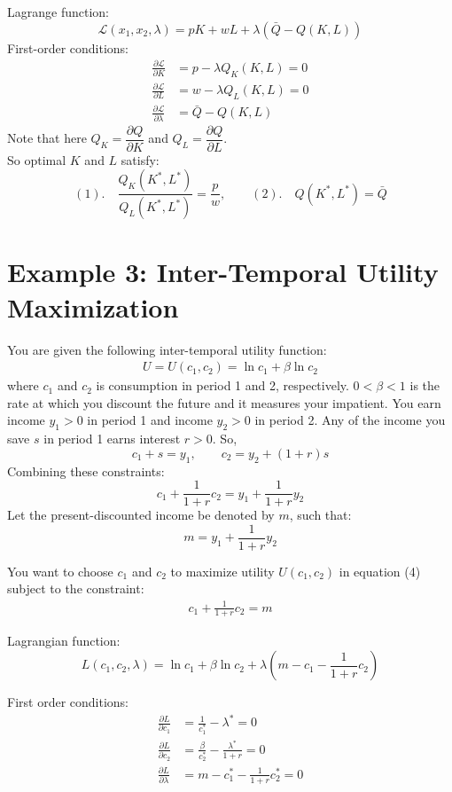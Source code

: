 \documentclass{./../../latex/handout}
\begin{document}
Lagrange function: 
  \[ \mathcal{L}(x_1,x_2,\lambda) =  p K + w L + \lambda(\bar{Q}-Q(K,L))\]
First-order conditions:
\begin{align*}
	\frac{\partial \mathcal{L}}{\partial K} &= p-\lambda Q_K(K,L)=0 \\ 
	 \frac{\partial \mathcal{L}}{\partial L} &= w-\lambda Q_L(K,L) = 0 \\
	  \frac{\partial \mathcal{L}}{\partial \lambda} &= \bar{Q}-Q(K,L)
\end{align*}
Note that here $Q_K = \dfrac{\partial Q}{\partial K}$ and $Q_L = \dfrac{\partial Q}{\partial L}$. \\

So optimal $K$ and $L$ satisfy:
\[ (1). \quad \frac{Q_K(K^*,L^*)}{Q_L(K^*,L^*)} = \frac{p}{w},  \quad \quad (2). \quad Q(K^*,L^*) = \bar{Q}\] 

\section*{Example 3: Inter-Temporal Utility Maximization}
You are given the following inter-temporal utility function:
\begin{align}
	U = U(c_1, c_2) =  \ln c_1 + \beta \ln c_2
\end{align}
where $c_1$ and $c_2$ is consumption in period 1 and 2, respectively. $0<\beta<1$ is the rate at which you discount the future and it measures your impatient. You earn income $y_1>0$ in period 1 and income $y_2>0$ in period 2. Any of the income you save $s$ in period 1 earns interest $r>0$. So, \[ c_1 + s = y_1, \quad \quad c_2 = y_2 + (1+r) s \]
Combining these constraints:
\[ c_1 + \frac{1}{1+r} c_2 = y_1 + \frac{1}{1+r} y_2 \]
Let the present-discounted income be denoted by $m$, such that:
\[ m = y_1 + \frac{1}{1+r} y_2 \]

\vspace{1em}
You want to choose $c_1$ and $c_2$ to maximize utility $U(c_1, c_2)$ in equation (4) subject to the constraint:
 \begin{align} c_1 + \frac{1}{1+r} c_2 = m \end{align}
 
 Lagrangian function:
\[ L(c_1, c_2, \lambda) = \ln c_1 + \beta \ln c_2 + \lambda\left(m- c_1 - \frac{1}{1+r} c_2 \right) \]

First order conditions:
\begin{align}
		\frac{\partial L}{\partial c_1}&=\frac{1}{c^*_1}-\lambda^*=0 \\
		\frac{\partial L}{\partial c_2}&=\frac{\beta}{c^*_2}-\frac{\lambda^*}{1+r}=0 \\
		\frac{\partial L}{\partial \lambda}&=m- c^*_1 - \frac{1}{1+r} c^*_2=0
	\end{align}
	
\end{document}
